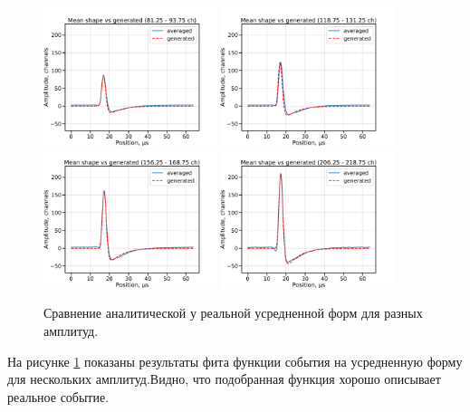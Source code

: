 \documentclass[a4paper,14pt]{extreport}
\begin{document}
\begin{figure}
  \centering
  \includegraphics[width = 0.45\textwidth]{img/signals/shapes/1.pdf}
  \includegraphics[width = 0.45\textwidth]{img/signals/shapes/2.pdf} \\
  \includegraphics[width = 0.45\textwidth]{img/signals/shapes/3.pdf} 
  \includegraphics[width = 0.45\textwidth]{img/signals/shapes/4.pdf}
  \caption{Сравнение аналитической у реальной усредненной форм для разных амплитуд.}
  \label{fig:signal-shapes}
\end{figure}

На рисунке \ref{fig:signal-shapes} показаны результаты фита функции события на усредненную форму для нескольких амплитуд.Видно, что подобранная функция хорошо описывает реальное событие.  
\end{document}
